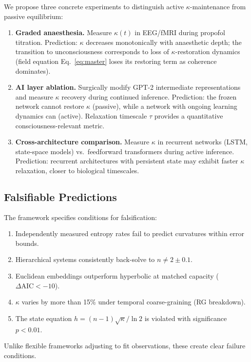 \documentclass[letterpaper]{article}
\begin{document}
We propose three concrete experiments to distinguish
active $\kappa$-maintenance from passive equilibrium:

\begin{enumerate}[nosep,leftmargin=*]
  \item \textbf{Graded anaesthesia.}
    Measure $\kappa(t)$ in EEG/fMRI during propofol
    titration.
    Prediction: $\kappa$ decreases monotonically with
    anaesthetic depth; the transition to unconsciousness
    corresponds to loss of $\kappa$-restoration dynamics
    (field equation Eq.~\ref{eq:master} loses its
    restoring term as coherence dominates).
  \item \textbf{AI layer ablation.}
    Surgically modify GPT-2 intermediate representations
    and measure $\kappa$ recovery during continued
    inference.
    Prediction: the frozen network cannot restore
    $\kappa$ (passive), while a network with ongoing
    learning dynamics can (active).
    Relaxation timescale $\tau$ provides a quantitative
    consciousness-relevant metric.
  \item \textbf{Cross-architecture comparison.}
    Measure $\kappa$ in recurrent networks (LSTM, state-space models) vs.\ feedforward transformers during
    active inference.
    Prediction: recurrent architectures with persistent
    state may exhibit faster $\kappa$ relaxation,
    closer to biological timescales.
\end{enumerate}

\subsection{Falsifiable Predictions}

The framework specifies conditions for falsification:
\begin{enumerate}[nosep,leftmargin=*]
  \item Independently measured entropy rates fail to
    predict curvatures within error bounds.
  \item Hierarchical systems consistently back-solve
    to $n\neq 2\pm 0.1$.
  \item Euclidean embeddings outperform hyperbolic at
    matched capacity ($\Delta\mathrm{AIC}<-10$).
  \item $\kappa$ varies by more than 15\% under
    temporal coarse-graining (RG breakdown).
  \item The state equation $h=(n{-}1)\sqrt{\kappa}/\ln 2$
    is violated with significance $p<0.01$.
\end{enumerate}
Unlike flexible frameworks adjusting to fit
observations, these create clear failure conditions.
\end{document}
